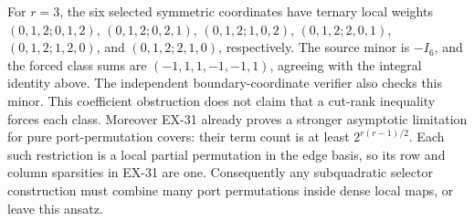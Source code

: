 For $r=3$, the six selected symmetric coordinates have ternary local weights
$(0,1,2;0,1,2)$, $(0,1,2;0,2,1)$, $(0,1,2;1,0,2)$,
$(0,1,2;2,0,1)$, $(0,1,2;1,2,0)$, and $(0,1,2;2,1,0)$,
respectively. The source minor is $-I_6$, and the forced class sums are
$(-1,1,1,-1,-1,1)$, agreeing with the integral identity above. The independent
boundary-coordinate verifier also checks this minor. This coefficient
obstruction does not claim that a cut-rank inequality forces each class.
Moreover EX-31 already proves a stronger asymptotic limitation for pure
port-permutation covers: their term count is at least
$2^{r(r-1)/2}$. Each such restriction is a local partial permutation in
the edge basis, so its row and column sparsities in EX-31 are one.
Consequently any subquadratic selector construction must combine many
port permutations inside dense local maps, or leave this ansatz.


